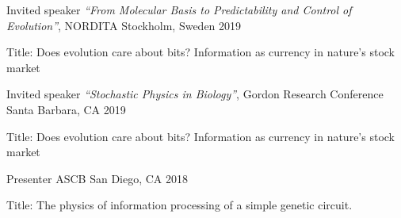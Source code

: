 
\begin{cventries}

  \cventry
    {Invited speaker} %
    {\textit{``From Molecular Basis to Predictability and Control of
    Evolution''}, NORDITA} %
    {Stockholm, Sweden} %
    {2019} %
    {
      \begin{cvitems} %
        \item {Title: Does evolution care about bits? Information as currency 
        in nature's stock market}
      \end{cvitems}
    }
  \cventry
    {Invited speaker} %
    {\textit{``Stochastic Physics in Biology''}, Gordon Research Conference}
    {Santa Barbara, CA} %
    {2019} %
    {
      \begin{cvitems} %
        \item {Title: Does evolution care about bits? Information as currency 
        in nature's stock market}
      \end{cvitems}
    }

\end{cventries}



\begin{cventries}
  \cventry
    {Presenter} %
    {ASCB} %
    {San Diego, CA} %
    {2018} %
    {
      \begin{cvitems} %
        \item {Title: The physics of information processing of a simple 
        genetic circuit.}
      \end{cvitems}
    }
  
\end{cventries}
